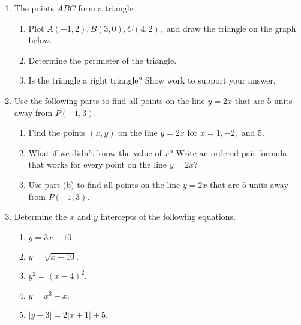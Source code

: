 \begin{enumerate}
\item The points $ABC$ form a triangle.
  \begin{enumerate}
  \item Plot $A(-1,2),B(3,0) , C(4,2), $ and draw the triangle on the graph below.\\

  \item Determine the perimeter of the triangle.
  \item Is the triangle a right triangle?  Show work to support your answer.
  \end{enumerate}

\item Use the following parts to find all points on the line $y=2x$ that are 5 units away from $P(-1,3)$.  
  \begin{enumerate}
  \item Find the points $(x,y)$ on the line $y=2x$ for $x=1, -2,$ and $5$.
  \item What if we didn't know the value of $x$?  Write an ordered
    pair formula that works for every point on the line $y=2x$?
  \item Use part (b) to find all points on the line $y=2x$ that are 5 units away from $P(-1,3)$. 
  \end{enumerate}


\item Determine the $x$ and $y$ intercepts of the following equations.
  \begin{enumerate}
  \item $\displaystyle y=3x+10.$
  \item $\displaystyle y=\sqrt{x-10}.$
  \item $\displaystyle y^2 = (x-4)^2.$
  \item $\displaystyle y = x^3 - x.$
  \item $\displaystyle |y-3| = 2|x+1| + 5.$
  \end{enumerate}


\end{enumerate}
